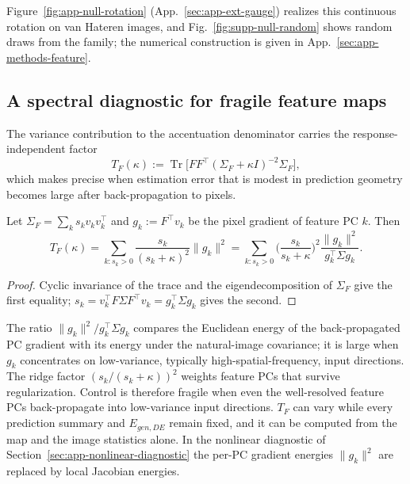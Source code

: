 {%
Figure~\ref{fig:app-null-rotation} (App.~\ref{sec:app-ext-gauge}) realizes this
continuous rotation on van Hateren images, and Fig.~\ref{fig:supp-null-random}
shows random draws from the family; the numerical construction is given in
App.~\ref{sec:app-methods-feature}.

\subsection{A spectral diagnostic for fragile feature maps}
\label{sec:app-feature-fragility}

The variance contribution to the accentuation denominator carries the
response-independent factor
\begin{equation}
T_F(\kappa):=\operatorname{Tr}\big[FF^\top(\Sigma_F+\kappa I)^{-2}\Sigma_F\big],
\label{eq:feature-fragility-trace}
\end{equation}
which makes precise when estimation error that is modest in prediction
geometry becomes large after back-propagation to pixels.

\begin{prop}
\label{prop:feature-fragility-spectrum}
Let $\Sigma_F=\sum_ks_kv_kv_k^\top$ and $g_k:=F^\top v_k$ be the pixel
gradient of feature PC $k$.  Then
\begin{equation}
T_F(\kappa)=\sum_{k:s_k>0}\frac{s_k}{(s_k+\kappa)^2}\|g_k\|^2
=\sum_{k:s_k>0}\Big(\frac{s_k}{s_k+\kappa}\Big)^2\frac{\|g_k\|^2}{g_k^\top\Sigma g_k}.
\label{eq:feature-fragility-spectrum}
\end{equation}
\end{prop}
\begin{proof}
Cyclic invariance of the trace and the eigendecomposition of $\Sigma_F$ give
the first equality; $s_k=v_k^\top F\Sigma F^\top v_k=g_k^\top\Sigma g_k$
gives the second.
\end{proof}

\begin{remark}
The ratio $\|g_k\|^2/g_k^\top\Sigma g_k$ compares the Euclidean energy of the
back-propagated PC gradient with its energy under the natural-image
covariance; it is large when $g_k$ concentrates on low-variance, typically
high-spatial-frequency, input directions.  The ridge factor
$(s_k/(s_k+\kappa))^2$ weights feature PCs that survive regularization.
Control is therefore fragile when even the well-resolved feature PCs
back-propagate into low-variance input directions.  $T_F$ can vary while
every prediction summary and $E_{gen,DE}$ remain fixed, and it can be
computed from the map and the image statistics alone.  In the nonlinear
diagnostic of Section~\ref{sec:app-nonlinear-diagnostic} the per-PC gradient
energies $\|g_k\|^2$ are replaced by local Jacobian energies.
\end{remark}

}

